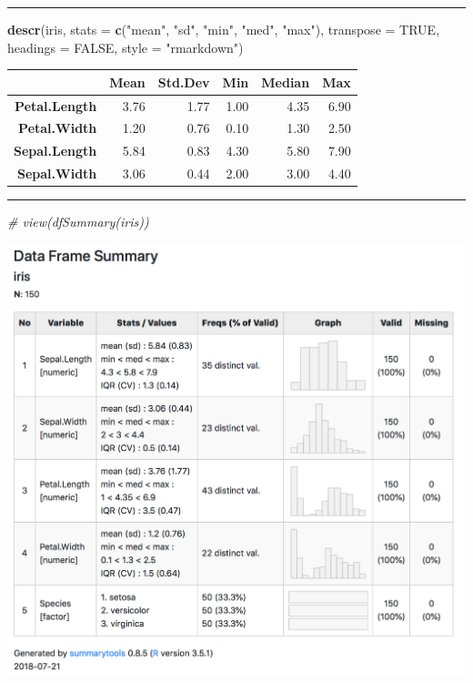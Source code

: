 \documentclass[]{article}
\newenvironment{Shaded}{\begin{snugshade}}{\end{snugshade}}
\newcommand{\CommentTok}[1]{\textcolor[rgb]{0.56,0.35,0.01}{\textit{#1}}}
\newcommand{\DataTypeTok}[1]{\textcolor[rgb]{0.13,0.29,0.53}{#1}}
\newcommand{\KeywordTok}[1]{\textcolor[rgb]{0.13,0.29,0.53}{\textbf{#1}}}
\newcommand{\NormalTok}[1]{#1}
\newcommand{\OtherTok}[1]{\textcolor[rgb]{0.56,0.35,0.01}{#1}}
\newcommand{\StringTok}[1]{\textcolor[rgb]{0.31,0.60,0.02}{#1}}
\begin{document}
\begin{center}\rule{0.5\linewidth}{\linethickness}\end{center}

\begin{Shaded}
\begin{Highlighting}[]
\KeywordTok{descr}\NormalTok{(iris, }\DataTypeTok{stats =} \KeywordTok{c}\NormalTok{(}\StringTok{"mean"}\NormalTok{, }\StringTok{"sd"}\NormalTok{, }\StringTok{"min"}\NormalTok{, }\StringTok{"med"}\NormalTok{, }\StringTok{"max"}\NormalTok{), }\DataTypeTok{transpose =} \OtherTok{TRUE}\NormalTok{, }
    \DataTypeTok{headings =} \OtherTok{FALSE}\NormalTok{, }\DataTypeTok{style =} \StringTok{"rmarkdown"}\NormalTok{)}
\end{Highlighting}
\end{Shaded}

\begin{longtable}[]{@{}rrrrrr@{}}
\toprule
~ & Mean & Std.Dev & Min & Median & Max\tabularnewline
\midrule
\endhead
\textbf{Petal.Length} & 3.76 & 1.77 & 1.00 & 4.35 & 6.90\tabularnewline
\textbf{Petal.Width} & 1.20 & 0.76 & 0.10 & 1.30 & 2.50\tabularnewline
\textbf{Sepal.Length} & 5.84 & 0.83 & 4.30 & 5.80 & 7.90\tabularnewline
\textbf{Sepal.Width} & 3.06 & 0.44 & 2.00 & 3.00 & 4.40\tabularnewline
\bottomrule
\end{longtable}

\begin{center}\rule{0.5\linewidth}{\linethickness}\end{center}

\begin{Shaded}
\begin{Highlighting}[]
\CommentTok{# view(dfSummary(iris))}
\end{Highlighting}
\end{Shaded}

\includegraphics{figures/dfsummary.png}
\end{document}
